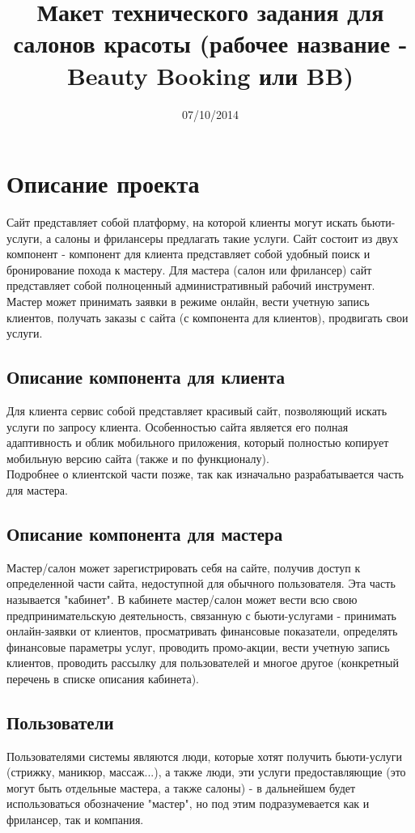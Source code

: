 \documentclass[DIV=calc, paper=a4, fontsize=11pt]{scrartcl} %
\title{Макет технического задания для салонов красоты (рабочее название - Beauty Booking или BB)}
\date{07/10/2014}
\begin{document}
\maketitle

\section{Описание проекта}
Сайт представляет собой платформу, на которой клиенты могут искать бьюти-услуги, а салоны и фрилансеры предлагать такие услуги. Сайт состоит из двух компонент - компонент для клиента представляет собой удобный поиск и бронирование похода к мастеру. Для мастера (салон или фрилансер) сайт представляет собой полноценный административный рабочий инструмент. Мастер может принимать заявки в режиме онлайн, вести учетную запись клиентов, получать заказы с сайта (с компонента для клиентов), продвигать свои услуги.
\subsection{Описание компонента для клиента}
Для клиента сервис собой представляет красивый сайт, позволяющий искать услуги по запросу клиента. Особенностью сайта является его полная адаптивность и облик мобильного приложения, который полностью копирует мобильную версию сайта (также и по функционалу). 
\\[0.5cm]
Подробнее о клиентской части позже, так как изначально разрабатывается часть для мастера.
\subsection{Описание компонента для мастера}
Мастер/салон может зарегистрировать себя на сайте, получив доступ к определенной части сайта, недоступной для обычного пользователя. Эта часть называется "кабинет". В кабинете мастер/салон может вести всю свою предпринимательскую деятельность, связанную с бьюти-услугами - принимать онлайн-заявки от клиентов, просматривать финансовые показатели, определять финансовые параметры услуг, проводить промо-акции, вести учетную запись клиентов, проводить рассылку для пользователей и многое другое (конкретный перечень в списке описания кабинета).
\subsection{Пользователи}
Пользователями системы являются люди, которые хотят получить бьюти-услуги (стрижку, маникюр, массаж...), а также люди, эти услуги предоставляющие (это могут быть отдельные мастера, а также салоны) - в дальнейшем будет использоваться обозначение "мастер", но под этим подразумевается как и фрилансер, так и компания.
\end{document}
